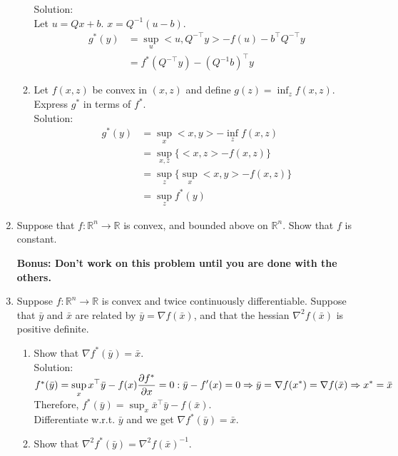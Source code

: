 \documentclass[12pt]{amsart}
\newcommand{\grad}{\nabla}
\begin{document}
\begin{enumerate}
\begin{enumerate}
\noindent
Solution:\\
Let $u = Qx + b$.  $x = Q^{-1}(u-b)$.
\begin{align*}
g^*(y) &= \sup_u <u, Q^{-\top} y> - f(u) - b^\top Q^{-\top} y\\
          &= f^*(Q^{-\top}y) - (Q^{-1} b)^\top y
\end{align*}

\item Let $f(x,z)$ be convex in $(x,z)$ and define $g(z) = \inf_z f(x,z)$. Express $g^*$ in terms of $f^*$.\\

\noindent
Solution:\\
\begin{align*}
g^*(y) &= \sup_x <x,y> - \inf_z f(x,z)\\
          &= \sup_{x,z} \{<x,z> - f(x,z)\}\\
	  &= \sup_z \{\sup_x <x,y> - f(x,z)\}\\
          &= \sup_z f^*(y)
\end{align*}
\end{enumerate}



\item Suppose that $f: \mathbb{R}^n \rightarrow \mathbb{R}$ is convex, and bounded above on $\mathbb{R}^n$. Show that $f$ is constant. 


\vspace{2in}

{\bf Bonus: Don't work on this problem until you are done with the others. }

\item Suppose $f: \mathbb{R}^n \rightarrow \mathbb{R}$ is convex and twice continuously differentiable. Suppose that $\bar y$ and $\bar x$ 
are related by $\bar y = \nabla f(\bar x)$, and that the hessian $\nabla^2 f(\bar x)$ is positive definite. 

\begin{enumerate}
\item  Show that $\nabla f^* (\bar y) = \bar x$. \\

\noindent
Solution:\\
$f^*(\bar y) = \displaystyle \sup_x x^\top \bar y - f(x)\\
\frac{\partial f^*}{\partial x} = 0 : \bar y - f'(x) = 0 \Rightarrow \bar y = \grad f(x^*) = \grad f(\bar x) \Rightarrow x^* = \bar x $\\

Therefore, $f^*(\bar y) = \displaystyle \sup_x \bar x^\top \bar y - f(\bar x)$.\\
Differentiate w.r.t. $\bar y$ and we get $\grad f^*(\bar y) = \bar x$.\\

\item Show that $\nabla^2 f^* (\bar y) = \nabla^2 f(\bar x)^{-1}$.

\end{enumerate}

\end{enumerate}
\end{document}
